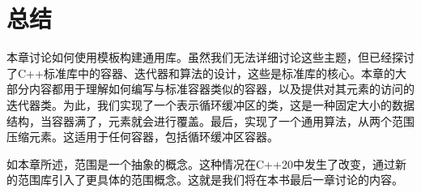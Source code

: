 \section{总结}
本章讨论如何使用模板构建通用库。虽然我们无法详细讨论这些主题，但已经探讨了C++标准库中的容器、迭代器和算法的设计，这些是标准库的核心。本章的大部分内容都用于理解如何编写与标准容器类似的容器，以及提供对其元素的访问的迭代器类。为此，我们实现了一个表示循环缓冲区的类，这是一种固定大小的数据结构，当容器满了，元素就会进行覆盖。最后，实现了一个通用算法，从两个范围压缩元素。这适用于任何容器，包括循环缓冲区容器。

如本章所述，范围是一个抽象的概念。这种情况在C++20中发生了改变，通过新的范围库引入了更具体的范围概念。这就是我们将在本书最后一章讨论的内容。